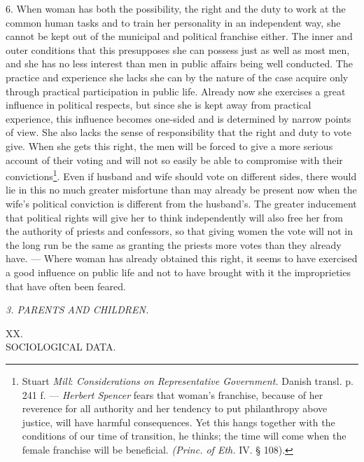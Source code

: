 \documentclass[12pt,a4paper,openany]{book}
\newcommand{\opage}[1]{\marginnote{\footnotesize\textit{[#1]}}}
\newcommand{\grouphead}[1]{\bigskip\begin{center}{\large #1}\end{center}}
\newcounter{etikch}
\newcommand{\chapterhead}[2]{\stepcounter{etikch}\bigskip\begin{center}\pdfbookmark[1]{#1 #2}{etikch.\arabic{etikch}}#1\\[3pt]{\large #2}\end{center}\medskip}
\begin{document}
6. When woman has both the possibility, the right and
\opage{325}the duty to work at the common human tasks and to train her personality in an independent way, she cannot be
kept out of the municipal and political franchise either. The inner and outer conditions that this presupposes she can
possess just as well as most men, and she has no less interest than men in public affairs being well conducted. The
practice and experience she lacks she can by the nature of the case acquire only through practical participation in
public life. Already now she exercises a great influence in political respects, but since she is kept away from
practical experience, this influence becomes one-sided and is determined by narrow points of view. She also lacks the
sense of responsibility that the right and duty to vote give. When she gets this right, the men will be forced to give a
more serious account of their voting and will not so easily be able to compromise with their
convictions\footnote[1]{Stuart \emph{Mill}: \textit{Considerations on Representative Government.} Danish transl. p. 241
f. --- \emph{Herbert Spencer} fears that woman's franchise, because of her reverence for all authority and her tendency
to put philanthropy above justice, will have harmful consequences. Yet this hangs together with the conditions of our
time of transition, he thinks; the time will come when the female franchise will be beneficial. \textit{(Princ. of Eth.}
IV. § 108).}. Even if husband and wife should vote on different sides, there would lie in this no much greater
misfortune than may already be present now when the wife's political conviction is different from the husband's. The
greater inducement that political rights will give her to think independently will also free her from the authority of
priests and confessors, so that giving women the vote will not in the long run be the same as granting the priests more
votes than they already have. --- Where woman has already obtained this right, it seems to have exercised a good
influence on public life and not to have brought with it the improprieties that have often been feared.

\opage{326}\grouphead{\textit{3. PARENTS AND CHILDREN.}}

\chapterhead{XX.}{SOCIOLOGICAL DATA.}
\end{document}
